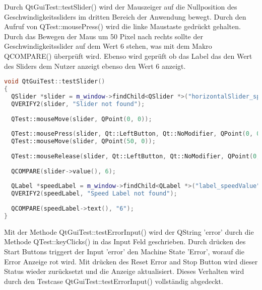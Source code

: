 		Durch QtGuiTest::testSlider() wird der Mauszeiger auf die Nullposition des Geschwindigkeitssliders im dritten Bereich der Anwendung bewegt. Durch den Aufruf von QTest::mousePress() wird die linke Maustaste gedrückt gehalten. Durch das Bewegen der Maus um 50 Pixel nach rechts sollte der Geschwindigkeitsslider auf dem Wert 6 stehen, was mit dem Makro QCOMPARE() überprüft wird. Ebenso wird geprüft ob das Label das den Wert des Sliders dem Nutzer anzeigt ebenso den Wert 6 anzeigt.
		\begin{lstlisting}[language=C++, caption=qtguitest.cpp]
void QtGuiTest::testSlider()
{
  QSlider *slider = m_window->findChild<QSlider *>("horizontalSlider_speed");
  QVERIFY2(slider, "Slider not found");
	
  QTest::mouseMove(slider, QPoint(0, 0));
	
  QTest::mousePress(slider, Qt::LeftButton, Qt::NoModifier, QPoint(0, 0));
  QTest::mouseMove(slider, QPoint(50, 0));
	
  QTest::mouseRelease(slider, Qt::LeftButton, Qt::NoModifier, QPoint(0, 0));
	
  QCOMPARE(slider->value(), 6);
	
  QLabel *speedLabel = m_window->findChild<QLabel *>("label_speedValue");
  QVERIFY2(speedLabel, "Speed Label not found");
	
  QCOMPARE(speedLabel->text(), "6");
}
		\end{lstlisting}
		Mit der Methode QtGuiTest::testErrorInput() wird der QString 'error' durch die Methode QTest::keyClicks() in das Input Feld geschrieben. Durch drücken des Start Buttons triggert der Input 'error' den Machine State 'Error', worauf die Error Anzeige rot wird. Mit drücken des Reset Error and Stop Button wird dieser Status wieder zurücksetzt und die Anzeige aktualisiert. Dieses Verhalten wird durch den Testcase QtGuiTest::testErrorInput() vollständig abgedeckt.
